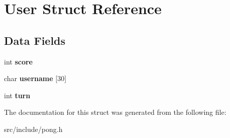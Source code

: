 \hypertarget{struct_user}{}\section{User Struct Reference}
\label{struct_user}
\subsection*{Data Fields}
\begin{DoxyCompactItemize}
\item 
\hypertarget{struct_user_a2abd31b5758f4a62d50426846cb51e6d}{}int {\bfseries score}\label{struct_user_a2abd31b5758f4a62d50426846cb51e6d}

\item 
\hypertarget{struct_user_a35770158bffb8e79ca598c8cad600d18}{}char {\bfseries username} \mbox{[}30\mbox{]}\label{struct_user_a35770158bffb8e79ca598c8cad600d18}

\item 
\hypertarget{struct_user_a7b135b5360559ace64db908c76df3294}{}int {\bfseries turn}\label{struct_user_a7b135b5360559ace64db908c76df3294}

\end{DoxyCompactItemize}


The documentation for this struct was generated from the following file\+:\begin{DoxyCompactItemize}
\item 
src/include/pong.\+h\end{DoxyCompactItemize}
